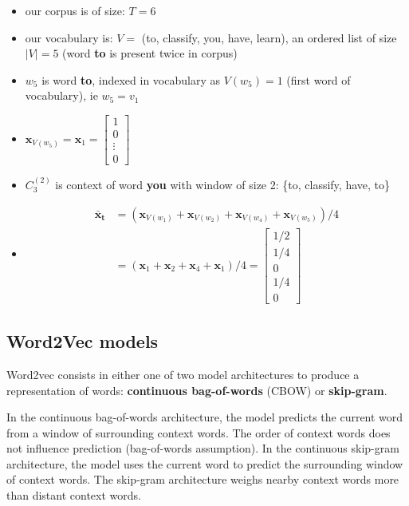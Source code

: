 \begin{itemize}
	\item our corpus is of size: $T=6$
	\item our vocabulary is: $V =$ (to, classify, you, have, learn), an ordered list of size $|V| = 5$ (word \textbf{to} is present twice in corpus)
	\item $w_5$ is word \textbf{to}, indexed in vocabulary as $V(w_5) = 1$ (first word of vocabulary), ie $w_5 = v_1$
	\item $\mathbf{x}_{V(w_5)} = \mathbf{x}_{1} = \begin{bmatrix} 
		1 \\
		0 \\
		\vdots\\
		0
	\end{bmatrix}$
	\item $C_3^{(2)}$ is context of word \textbf{you} with window of size 2: \{to, classify, have, to\}
	\item 
		\begin{align}
		\mathbf{\bar x_t} &= (\mathbf{x}_{V(w_1)} +\mathbf{x}_{V(w_2)} + \mathbf{x}_{V(w_4)} + \mathbf{x}_{V(w_5)}) / 4 \\ 
		&= (\mathbf{x}_{1} +\mathbf{x}_{2} + \mathbf{x}_{4} + \mathbf{x}_{1}) / 4 
		=\begin{bmatrix} 
			1/2 \\
			1/4 \\
			0\\
			1/4\\
			0
		\end{bmatrix}
	\end{align}
\end{itemize}


\subsection{Word2Vec models}

Word2vec consists in either one of two model architectures to produce a representation of words: \textbf{continuous bag-of-words} (CBOW) or \textbf{skip-gram}. 

In the continuous bag-of-words architecture, the model predicts the current word from a window of surrounding context words. The order of context words does not influence prediction (bag-of-words assumption). In the continuous skip-gram architecture, the model uses the current word to predict the surrounding window of context words. 
The skip-gram architecture weighs nearby context words more than distant context words.

